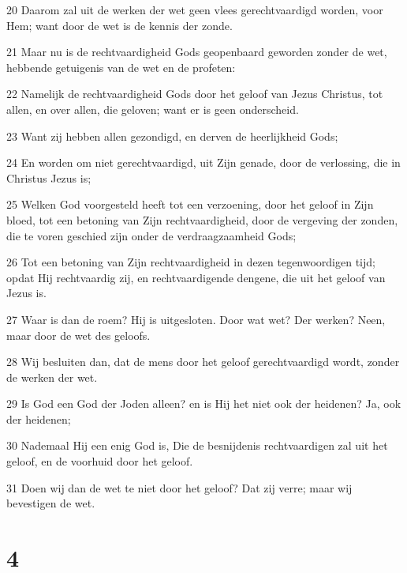 \par 20 Daarom zal uit de werken der wet geen vlees gerechtvaardigd worden, voor Hem; want door de wet is de kennis der zonde.
\par 21 Maar nu is de rechtvaardigheid Gods geopenbaard geworden zonder de wet, hebbende getuigenis van de wet en de profeten:
\par 22 Namelijk de rechtvaardigheid Gods door het geloof van Jezus Christus, tot allen, en over allen, die geloven; want er is geen onderscheid.
\par 23 Want zij hebben allen gezondigd, en derven de heerlijkheid Gods;
\par 24 En worden om niet gerechtvaardigd, uit Zijn genade, door de verlossing, die in Christus Jezus is;
\par 25 Welken God voorgesteld heeft tot een verzoening, door het geloof in Zijn bloed, tot een betoning van Zijn rechtvaardigheid, door de vergeving der zonden, die te voren geschied zijn onder de verdraagzaamheid Gods;
\par 26 Tot een betoning van Zijn rechtvaardigheid in dezen tegenwoordigen tijd; opdat Hij rechtvaardig zij, en rechtvaardigende dengene, die uit het geloof van Jezus is.
\par 27 Waar is dan de roem? Hij is uitgesloten. Door wat wet? Der werken? Neen, maar door de wet des geloofs.
\par 28 Wij besluiten dan, dat de mens door het geloof gerechtvaardigd wordt, zonder de werken der wet.
\par 29 Is God een God der Joden alleen? en is Hij het niet ook der heidenen? Ja, ook der heidenen;
\par 30 Nademaal Hij een enig God is, Die de besnijdenis rechtvaardigen zal uit het geloof, en de voorhuid door het geloof.
\par 31 Doen wij dan de wet te niet door het geloof? Dat zij verre; maar wij bevestigen de wet.

\chapter{4}

